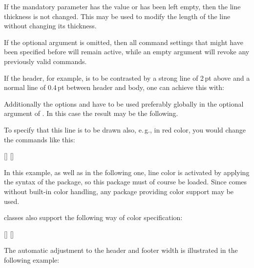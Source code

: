 If the mandatory parameter has the value  or has been
left empty, then the line thickness is not changed.  This may be used
to modify the length of the line without changing its thickness.

If the optional argument  is omitted, then all command
settings that might have been specified before will remain active,
while an empty  argument will revoke any previously
valid commands.

\begin{Example}
  If the header, for example, is to be contrasted by a strong line of
  2\,pt above and a normal line of 0.4\,pt between header and body,
  one can achieve this with:
\begin{lstcode}
  \setheadtopline{2pt}
  \setheadsepline{.4pt}
\end{lstcode}
  Additionally the options  and
   have to be used preferably globally in the optional
  argument of . In this case the result may be the
  following.
%
\begin{XmpTopPage}
        \thinlines{}
        \thicklines{}
\end{XmpTopPage}

   To specify that this line is to be drawn also, e.\,g., in red color, you 
   would change the commands like this:
\begin{lstcode}
  \setheadtopline{2pt}[\color{red}]
  \setheadsepline{.4pt}[\color{red}]
\end{lstcode}
  In this example, as well as in the following one, line color is
  activated by applying the syntax of the
   package, so this package must of
  course be loaded. Since  comes without built-in
  color handling, any package providing color support may be used.

  {\KOMAScript} classes also support the following way of color specification:
\begin{lstcode}
  \setheadtopline{2pt}
  \setheadsepline{.4pt}
  [\color{red}]
  [\color{red}]
\end{lstcode}

  The automatic adjustment to the header and footer width is illustrated
  in the following example:
\begin{lstcode}
  \setfootbotline{2pt}
  \setfootsepline[text]{.4pt}
\end{lstcode}

  \label{page:scrpage.autoLineLength}
  \begin{XmpBotPage}
    \thinlines{}
    \thicklines{}
  \end{XmpBotPage}
\end{Example}
